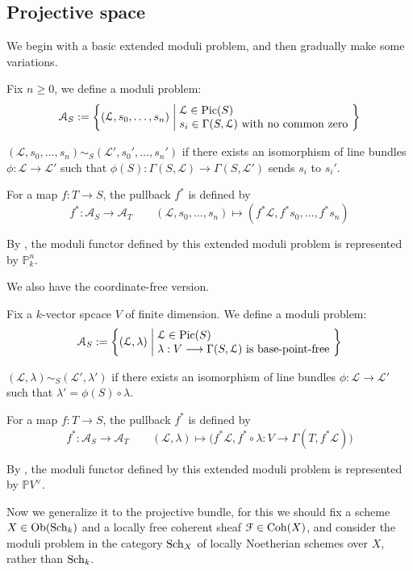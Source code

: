 \subsection{Projective space}
We begin with a basic extended moduli problem, and then gradually make some variations.
\begin{eg}
Fix $n \geqslant 0$, we define a moduli problem:
$$\mathcal{A}_S:=\left\{(\mathcal{L},s_0,\ldots,s_n)  \;\middle|\; \begin{aligned}
&\\[-5mm]
&\mathcal{L} \in \operatorname{Pic}(S)\\[-1mm]
& s_i \in \Gamma(S,\mathcal{L}) \text{ with no common zero }
\end{aligned}
 \right\}$$
 
  $(\mathcal{L},s_0,\ldots,s_n) \sim_S (\mathcal{L}',s_0',\ldots,s_n')$ if there exists an isomorphism of line bundles $\phi:\mathcal{L} \longrightarrow \mathcal{L}'$ such that $\phi(S):\Gamma(S,\mathcal{L}) \longrightarrow \Gamma(S,\mathcal{L}')$ sends $s_i$ to $s_i'$.
  
  For a map $f:T \longrightarrow S$, the pullback $f^*$ is defined by
     $$f^*:\mathcal{A}_S \longrightarrow \mathcal{A}_T \qquad (\mathcal{L},s_0,\ldots,s_n) \longmapsto (f^*\mathcal{L},f^*s_0,\ldots,f^*s_n)$$
     
By \cite[15.3.F, 16.4.1]{FOAG}, the moduli functor defined by this extended moduli problem is represented by $\mathbb{P}_k^n$.
\end{eg}
We also have the coordinate-free version.
\begin{eg}[{Coordinate-free projective space $\mathbb{P}V^{\vee}=\Proj(\Sym^{\bullet} V)$, see \cite[4.5.12]{FOAG}}]
Fix a $k$-vector spcace $V$ of finite dimension. We define a moduli problem:
$$\mathcal{A}_S:=\left\{(\mathcal{L},\lambda)  \;\middle|\; \begin{aligned}
&\\[-5mm]
&\mathcal{L} \in \operatorname{Pic}(S)\\[-1mm]
& \lambda:V \longrightarrow \Gamma(S,\mathcal{L}) \text{ is base-point-free }
\end{aligned}
 \right\}$$
 
   $(\mathcal{L},\lambda) \sim_S (\mathcal{L}',\lambda')$ if there exists an isomorphism of line bundles $\phi:\mathcal{L} \longrightarrow \mathcal{L}'$ such that $\lambda'=\phi(S) \circ \lambda$.
   
   For a map $f:T \longrightarrow S$, the pullback $f^*$ is defined by
      $$f^*:\mathcal{A}_S \longrightarrow \mathcal{A}_T \qquad (\mathcal{L},\lambda) \longmapsto \big(f^*\mathcal{L},f^*\circ \lambda:V \rightarrow \Gamma(T,f^*\mathcal{L})\big)$$
      
      By \cite[16.4.E]{FOAG}, the moduli functor defined by this extended moduli problem is represented by $\mathbb{P}V^{\vee}$.
\end{eg}
Now we generalize it to the projective bundle, for this we should fix a scheme $X \in \operatorname{Ob}(\operatorname{Sch}_{k})$ and a locally free coherent sheaf $\mathcal{F} \in \operatorname{Coh}(X)$, and consider the moduli problem in the category $\operatorname{Sch}_{X}$ of locally Noetherian schemes over $X$, rather than $\operatorname{Sch}_{k}$.

